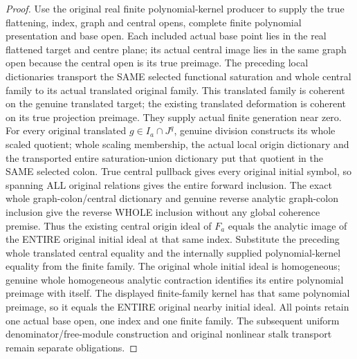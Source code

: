 \begin{proof}
Use the original real finite polynomial-kernel producer to supply the true
flattening, index, graph and central opens, complete finite polynomial
presentation and base open. Each included actual base point lies in the
real flattened target and centre plane; its actual central image lies in
the same graph open because the central open is its true preimage.
The preceding local dictionaries transport the SAME selected functional
saturation and whole central family to its actual translated original family.
This translated family is coherent on the genuine translated target; the
existing translated deformation is coherent on its true projection preimage.
They supply actual finite generation near zero. For every original translated
$g\in I_a\cap J^q$, genuine division constructs its whole scaled quotient;
whole scaling membership, the actual local origin dictionary and the transported
entire saturation-union dictionary put that quotient in the SAME selected
colon. True central pullback gives every original initial symbol, so spanning
ALL original relations gives the entire forward inclusion. The exact whole
graph-colon/central dictionary and genuine reverse analytic graph-colon
inclusion give the reverse WHOLE inclusion without any global coherence
premise. Thus the existing central origin ideal of $F_a$ equals the analytic
image of the ENTIRE original initial ideal at that same index. Substitute the
preceding whole translated central equality and the internally supplied
polynomial-kernel equality from the finite family. The original whole initial
ideal is homogeneous; genuine whole homogeneous analytic contraction identifies
its entire polynomial preimage with itself. The displayed finite-family kernel
has that same polynomial preimage, so it equals the ENTIRE original nearby
initial ideal. All points retain one actual base open, one index and one
finite family. The subsequent uniform denominator/free-module construction and
original nonlinear stalk transport remain separate obligations.
\end{proof}
